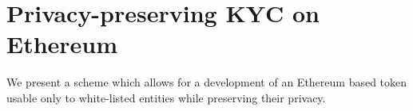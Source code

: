 
\chapter{Privacy-preserving KYC on Ethereum} %

\label{Chapter12_KYC} %

We present a scheme which allows for a development of an Ethereum based token usable only to white-listed entities while preserving their privacy.